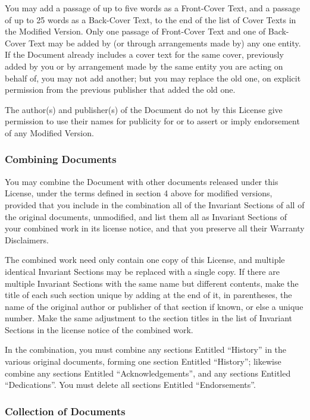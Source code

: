 You may add a passage of up to five words as a Front-Cover Text, and a passage
of up to 25 words as a Back-Cover Text, to the end of the list of Cover Texts
in the Modified Version.  Only one passage of Front-Cover Text and one of
Back-Cover Text may be added by (or through arrangements made by) any one
entity.  If the Document already includes a cover text for the same cover,
previously added by you or by arrangement made by the same entity you are
acting on behalf of, you may not add another; but you may replace the old one,
on explicit permission from the previous publisher that added the old one.

The author(s) and publisher(s) of the Document do not by this License give
permission to use their names for publicity for or to assert or imply
endorsement of any Modified Version.


\subsubsection{Combining Documents}

You may combine the Document with other documents released under this License,
under the terms defined in section 4 above for modified versions, provided that
you include in the combination all of the Invariant Sections of all of the
original documents, unmodified, and list them all as Invariant Sections of your
combined work in its license notice, and that you preserve all their Warranty
Disclaimers.

The combined work need only contain one copy of this License, and multiple
identical Invariant Sections may be replaced with a single copy.  If there are
multiple Invariant Sections with the same name but different contents, make the
title of each such section unique by adding at the end of it, in parentheses,
the name of the original author or publisher of that section if known, or else
a unique number. Make the same adjustment to the section titles in the list of
Invariant Sections in the license notice of the combined work.

In the combination, you must combine any sections Entitled ``History'' in the
various original documents, forming one section Entitled ``History''; likewise
combine any sections Entitled ``Acknowledgements'', and any sections Entitled
``Dedications''.  You must delete all sections Entitled ``Endorsements''.


\subsubsection{Collection of Documents}

